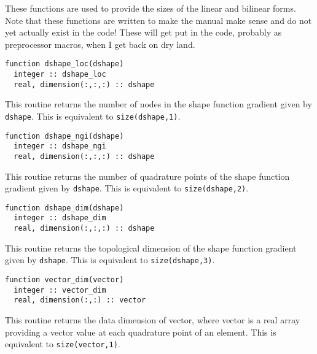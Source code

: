 \documentclass[a4paper, 11pt]{book}
\begin{document}
These functions are used to provide the sizes of the linear and bilinear
forms. Note that these functions are written to make the manual make sense
and do not yet actually exist in the code! These will get put in the code,
probably as preprocessor macros, when I get back on dry land.


\begin{lstlisting}
function dshape_loc(dshape)
  integer :: dshape_loc
  real, dimension(:,:,:) :: dshape
\end{lstlisting}

This routine returns the number of nodes in the shape function
gradient given by \lstinline+dshape+. This is equivalent to
\lstinline+size(dshape,1)+.



\begin{lstlisting}
function dshape_ngi(dshape)
  integer :: dshape_ngi
  real, dimension(:,:,:) :: dshape
\end{lstlisting}

This routine returns the number of quadrature points of the shape function
gradient given by \lstinline+dshape+. This is equivalent to
\lstinline+size(dshape,2)+.



\begin{lstlisting}
function dshape_dim(dshape)
  integer :: dshape_dim
  real, dimension(:,:,:) :: dshape
\end{lstlisting}

This routine returns the topological dimension of the shape function
gradient given by \lstinline+dshape+. This is equivalent to
\lstinline+size(dshape,3)+.



\begin{lstlisting}
function vector_dim(vector)
  integer :: vector_dim
  real, dimension(:,:) :: vector
\end{lstlisting}

This routine returns the data dimension of vector, where vector is a real
array providing a vector value at each quadrature point of an element. 
 This is equivalent to \lstinline+size(vector,1)+.


\end{document}
